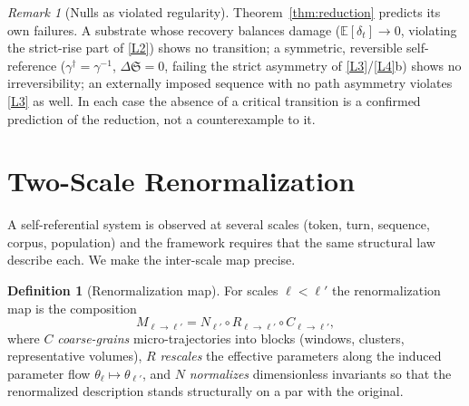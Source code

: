 \documentclass[11pt]{article}
\theoremstyle{plain}
\theoremstyle{definition}
\newtheorem{definition}[theorem]{Definition}
\theoremstyle{remark}
\newtheorem{remark}[theorem]{Remark}
\newcommand{\E}{\mathbb{E}}
\newcommand{\Sep}{\mathfrak{S}}
\begin{document}
\begin{remark}[Nulls as violated regularity]\label{rem:nulls}
Theorem~\ref{thm:reduction} predicts its own failures. A substrate whose recovery balances damage ($\E[\delta_t]\to0$, violating the strict-rise part of \ref{L2}) shows no transition; a symmetric, reversible self-reference ($\gamma^\dagger=\gamma^{-1}$, $\Delta\Sep=0$, failing the strict asymmetry of \ref{L3}/\ref{L4}b) shows no irreversibility; an externally imposed sequence with no path asymmetry violates \ref{L3} as well. In each case the absence of a critical transition is a confirmed prediction of the reduction, not a counterexample to it.
\end{remark}

\section{Two-Scale Renormalization}\label{sec:renorm}

A self-referential system is observed at several scales (token, turn, sequence, corpus, population) and the framework requires that the same structural law describe each. We make the inter-scale map precise.

\begin{definition}[Renormalization map]\label{def:M}
For scales $\ell<\ell'$ the renormalization map is the composition
\begin{equation}\label{eq:M}
M_{\ell\to\ell'}=N_{\ell'}\circ R_{\ell\to\ell'}\circ C_{\ell\to\ell'},
\end{equation}
where $C$ \emph{coarse-grains} micro-trajectories into blocks (windows, clusters, representative volumes), $R$ \emph{rescales} the effective parameters along the induced parameter flow $\theta_\ell\mapsto\theta_{\ell'}$, and $N$ \emph{normalizes} dimensionless invariants so that the renormalized description stands structurally on a par with the original.
\end{definition}
\end{document}
